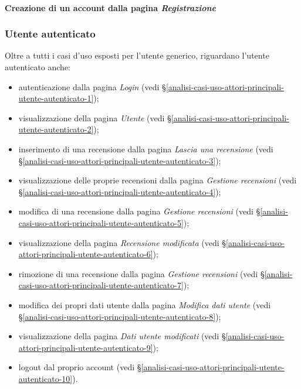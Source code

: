 \paragraph{Creazione di un account dalla pagina \textit{Registrazione}}
\label{analisi-casi-uso-attori-principali-utente-generico-19}

\subsubsection{Utente autenticato}
\label{analisi-casi-uso-attori-principali-utente-autenticato}
Oltre a tutti i casi d'uso esposti per l'utente generico, riguardano l'utente autenticato anche:
\begin{itemize}
	\item autenticazione dalla pagina \textit{Login} (vedi §\ref{analisi-casi-uso-attori-principali-utente-autenticato-1});
	\item visualizzazione della pagina \textit{Utente} (vedi §\ref{analisi-casi-uso-attori-principali-utente-autenticato-2});
	\item inserimento di una recensione dalla pagina \textit{Lascia una recensione} (vedi §\ref{analisi-casi-uso-attori-principali-utente-autenticato-3});
	\item visualizzazione delle proprie recensioni dalla pagina \textit{Gestione recensioni} (vedi §\ref{analisi-casi-uso-attori-principali-utente-autenticato-4});
	\item modifica di una recensione dalla pagina \textit{Gestione recensioni} (vedi §\ref{analisi-casi-uso-attori-principali-utente-autenticato-5});
	\item visualizzazione della pagina \textit{Recensione modificata} (vedi §\ref{analisi-casi-uso-attori-principali-utente-autenticato-6});
	\item rimozione di una recensione dalla pagina \textit{Gestione recensioni} (vedi §\ref{analisi-casi-uso-attori-principali-utente-autenticato-7});
	\item modifica dei propri dati utente dalla pagina \textit{Modifica dati utente} (vedi §\ref{analisi-casi-uso-attori-principali-utente-autenticato-8});
	\item visualizzazione della pagina \textit{Dati utente modificati} (vedi §\ref{analisi-casi-uso-attori-principali-utente-autenticato-9});
	\item logout dal proprio account (vedi §\ref{analisi-casi-uso-attori-principali-utente-autenticato-10}).
\end{itemize}

